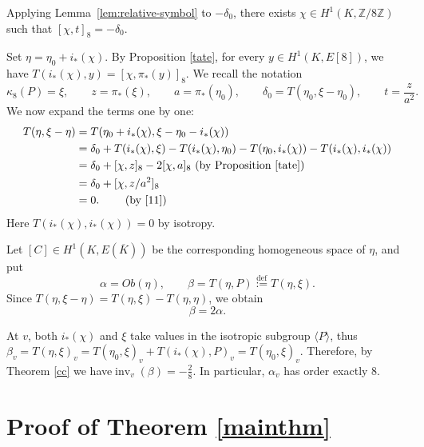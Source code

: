 \documentclass[11pt,a4paper]{amsart}
\theoremstyle{definition}
\newcommand{\inv}{\operatorname{inv}}
\numberwithin{equation}{section}
\begin{document}
Applying Lemma~\ref{lem:relative-symbol} to $-\delta_0$, there exists $\chi\in H^1(K,\mathbb{Z}/8\mathbb{Z})$ such that
 $\label{11}
 	 [\chi,t]_8=-\delta_0.
$


Set $\label{eq:eta-final}
 \eta=\eta_0+i_*(\chi)$.
By Proposition \ref{tate}, for every \(y\in H^1(K,E[8])\), we have $
T(i_*(\chi),y)=[\chi,\pi_*(y)]_8.$
We recall the notation
\[
\kappa_8(P)=\xi,\qquad z=\pi_*(\xi),\qquad
a=\pi_*(\eta_0),\qquad \delta_0=T(\eta_0,\xi-\eta_0),
\qquad
t=\frac z{a^2}.
\]
We now expand the terms one by one:
\begin{align*}
 T(\eta,\xi-\eta)
 &=T(\eta_0+i_*(\chi),\xi-\eta_0-i_*(\chi))\notag\\
 &=\delta_0+T(i_*(\chi),\xi)-T(i_*(\chi),\eta_0)
   -T(\eta_0,i_*(\chi))-T(i_*(\chi),i_*(\chi))\notag\\
 &=\delta_0+[\chi,z]_8-2[\chi,a]_8   \text{ (by Proposition \ref{tate})}\notag\\
 &=\delta_0+[\chi,z/a^2]_8\notag\\
 &=0.\label{eq:defect-killed} \qquad \text{ (by  \eqref{11})}
\end{align*}
Here $T(i_*(\chi),i_*(\chi))=0$ by isotropy.

Let $[C]\in H^1(K,E(\overline{K}))$ be the corresponding homogeneous space of $\eta$, and put
\begin{equation*}\label{eq:alpha-beta}
 \alpha=Ob(\eta),
 \qquad
 \beta=T(\eta, P)\overset{\mathrm{def}}{:=}T(\eta,\xi).
\end{equation*}
Since $T(\eta,\xi-\eta)=T(\eta,\xi)-T(\eta,\eta)$, we obtain
\begin{equation}\label{eq:beta-2alpha}
   \beta=2\alpha.
\end{equation}

At $v$, both $i_*(\chi)$ and $\xi$ take values in the
isotropic subgroup $\langle P\rangle$, thus $\beta_v=T(\eta,\xi)_v=T(\eta_0,\xi)_v+T(i_*(\chi),P)_v=T(\eta_0,\xi)_v$.  Therefore, by Theorem \ref{cc} we have$\label{eq:beta-final-local}
 \inv_{v}(\beta)=-\frac28.$
In particular,  $\alpha_{v}$  has  order exactly $8$. 
\section{Proof  of Theorem \ref{mainthm}}
\end{document}
